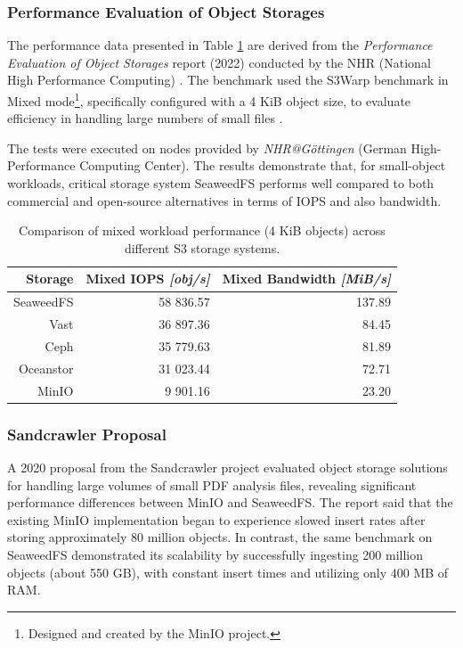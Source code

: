 \subsubsection*{Performance Evaluation of Object Storages}
The performance data presented in Table \ref{tab:bm1} are derived from the \textit{Performance Evaluation of Object Storages} report (2022) conducted by the NHR (National High Performance Computing) \cite{lackschewitz_performance_2022}. The benchmark used the S3Warp benchmark in Mixed mode\footnote{Designed and created by the MinIO project.}, specifically configured with a 4 KiB object size, to evaluate efficiency in handling large numbers of small files \cite{lackschewitz_performance_2022}. 

The tests were executed on nodes provided by \textit{NHR@Göttingen} (German High-Performance Computing Center). The results demonstrate that, for small-object workloads, critical storage system SeaweedFS performs well compared to both commercial and open-source alternatives in terms of IOPS and also bandwidth. \cite{lackschewitz_performance_2022}

\begin{table}[!ht]\centering
    \renewcommand{\arraystretch}{1.3}
    \begin{tabular}{r|r|r}
         Storage & Mixed IOPS \textit{[obj/s]}  & Mixed Bandwidth \textit{[MiB/s]} \\ \hline \hline
         SeaweedFS  &  58 836.57 & 137.89 \\
         Vast       &  36 897.36 & 84.45 \\
         Ceph       &  35 779.63 & 81.89 \\
         Oceanstor  &  31 023.44 & 72.71 \\
         MinIO      &  9 901.16  & 23.20 \\
    \end{tabular}
    \caption[Comparison of mixed workload performance]{Comparison of mixed workload performance (4 KiB objects) across different S3 storage systems.\cite{lackschewitz_performance_2022}}
    \label{tab:bm1}
\end{table}

\subsubsection*{Sandcrawler Proposal}
A 2020 proposal from the Sandcrawler project evaluated object storage solutions for handling large volumes of small PDF analysis files, revealing significant performance differences between MinIO and SeaweedFS. The report said that the existing MinIO implementation began to experience slowed insert rates after storing approximately 80 million objects. In contrast, the same benchmark on SeaweedFS demonstrated its scalability by successfully ingesting 200 million objects (about 550 GB), with constant insert times and utilizing only 400 MB of RAM. \cite{newbold_notes_2001}

